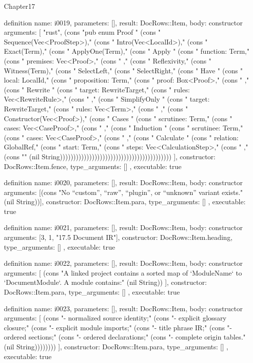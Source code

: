 \begin{lexlean}{Chapter17}
\begin{semanticmodule}
definition{
  name: i0019,
  parameters: [],
  result: DocRows::Item,
  body: constructor{
    arguments: [
      "rust",
      (cons "pub enum Proof {" (cons "    Sequence(Vec<ProofStep>)," (cons "    Intro(Vec<LocalId>)," (cons "    Exact(Term)," (cons "    ApplyOne(Term)," (cons "    Apply {" (cons "        function: Term," (cons "        premises: Vec<Proof>," (cons "    }," (cons "    Reflexivity," (cons "    Witness(Term)," (cons "    SelectLeft," (cons "    SelectRight," (cons "    Have {" (cons "        local: LocalId," (cons "        proposition: Term," (cons "        proof: Box<Proof>," (cons "    }," (cons "    Rewrite {" (cons "        target: RewriteTarget," (cons "        rules: Vec<RewriteRule>," (cons "    }," (cons "    SimplifyOnly {" (cons "        target: RewriteTarget," (cons "        rules: Vec<Term>," (cons "    }," (cons "    Constructor(Vec<Proof>)," (cons "    Cases {" (cons "        scrutinee: Term," (cons "        cases: Vec<CaseProof>," (cons "    }," (cons "    Induction {" (cons "        scrutinee: Term," (cons "        cases: Vec<CaseProof>," (cons "    }," (cons "    Calculate {" (cons "        relation: GlobalRef," (cons "        start: Term," (cons "        steps: Vec<CalculationStep>," (cons "    }," (cons "}" (nil String))))))))))))))))))))))))))))))))))))))))))
    ],
    constructor: DocRows::Item.fence,
    type_arguments: []
  },
  executable: true
}

definition{
  name: i0020,
  parameters: [],
  result: DocRows::Item,
  body: constructor{
    arguments: [(cons "No “custom”, “raw”, “plugin”, or “unknown” variant exists." (nil String))],
    constructor: DocRows::Item.para,
    type_arguments: []
  },
  executable: true
}

definition{
  name: i0021,
  parameters: [],
  result: DocRows::Item,
  body: constructor{
    arguments: [3, 1, "17.5 Document IR"],
    constructor: DocRows::Item.heading,
    type_arguments: []
  },
  executable: true
}

definition{
  name: i0022,
  parameters: [],
  result: DocRows::Item,
  body: constructor{
    arguments: [
      (cons "A linked project contains a sorted map of `ModuleName` to `DocumentModule`. A module contains:" (nil String))
    ],
    constructor: DocRows::Item.para,
    type_arguments: []
  },
  executable: true
}

definition{
  name: i0023,
  parameters: [],
  result: DocRows::Item,
  body: constructor{
    arguments: [
      (cons "- normalized source identity;" (cons "- explicit glossary closure;" (cons "- explicit module imports;" (cons "- title phrase IR;" (cons "- ordered sections;" (cons "- ordered declarations;" (cons "- complete origin tables." (nil String))))))))
    ],
    constructor: DocRows::Item.para,
    type_arguments: []
  },
  executable: true
}


\end{semanticmodule}
\end{lexlean}
